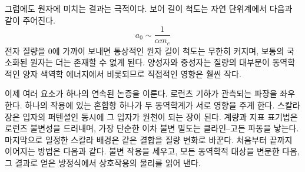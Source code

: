 그럼에도 원자에 미치는 결과는 극적이다. 보어 길이 척도는 자연 단위계에서 다음과 같이 주어진다.
\begin{equation}
a_0\sim\frac{1}{\alpha m_e}
\end{equation}
전자 질량을 0에 가까이 보내면 통상적인 원자 길이 척도는 무한히 커지며, 보통의 국소화된 원자는 더는 존재할 수 없게 된다. 양성자와 중성자는 질량의 대부분이 동역학적인 양자 색역학 에너지에서 비롯되므로 직접적인 영향은 훨씬 작다.

이제 여러 요소가 하나의 연속된 논증을 이룬다. 로런츠 기하가 관측되는 파장을 좌우한다. 하나의 작용에 있는 혼합항 하나가 두 동역학계가 서로 영향을 주게 한다. 스칼라장은 입자의 퍼텐셜인 동시에 그 입자가 원천이 되는 장이 된다. 계량과 지표 표기법은 로런츠 불변성을 드러내며, 가장 단순한 이차 불변 밀도는 클라인--고든 파동을 낳는다. 마지막으로 일정한 스칼라 배경은 같은 결합을 질량 변화로 바꾼다. 처음부터 끝까지 이어지는 방법은 다음과 같다. 불변 작용을 세우고, 모든 동역학적 대상을 변분한 다음, 그 결과로 얻은 방정식에서 상호작용의 물리를 읽어 낸다.